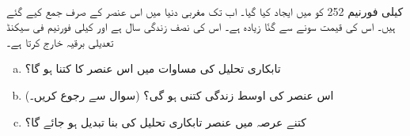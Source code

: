 \\
کیلی فورنیم 252 کو  میں ایجاد کیا گیا۔ اب تک مغربی دنیا میں اس عنصر کے صرف  جمع کیے گئے ہیں۔ اس کی قیمت سونے سے  گنّا زیادہ ہے۔ اس کی نصف زندگی  سال ہے اور   کیلی فورنیم فی سیکنڈ  تعدیلی برقیہ خارج کرتا ہے۔
\begin{enumerate}[a.]
\item
تابکاری تحلیل کی مساوات میں اس عنصر کا  کتنا ہو گا؟
\item
اس عنصر کی اوسط زندگی کتنی ہو گی؟ (سوال  سے رجوع کریں۔)
\item
کتنے عرصہ میں  عنصر تابکاری تحلیل کی بنا تبدیل ہو جائے گا؟
\end{enumerate}

